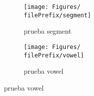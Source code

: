 \begin{figure}[ht]
  \centering
  \begin{subfigure}[b]{0.5\linewidth}
    \centering\texttt{[image: Figures/\\filePrefix/segment]}
    \caption{prueba segment}
    \label{fig:\undPrefix_segment}
  \end{subfigure}%
  \begin{subfigure}[b]{0.5\linewidth}
    \centering\texttt{[image: Figures/\\filePrefix/vowel]}
    \caption{prueba vowel}
    \label{fig:\undPrefix_vowel}
  \end{subfigure}
\end{figure}


\let\major\undefined
\let\minor\undefined

\let\undPrefix\undefined
\let\dotPrefix\undefined
\let\scoPrefix\undefined

\let\filePrefix\undefined
